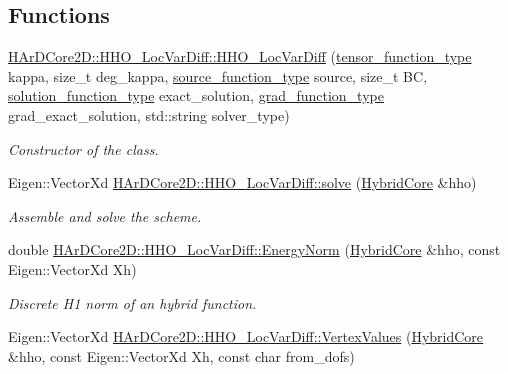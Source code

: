 \subsection*{Functions}
\begin{DoxyCompactItemize}
\item 
\hyperlink{group__HHO__LocVarDiff_ga5f2ab34d1e5afb3d83b548a1cb09f83a}{H\+Ar\+D\+Core2\+D\+::\+H\+H\+O\+\_\+\+Loc\+Var\+Diff\+::\+H\+H\+O\+\_\+\+Loc\+Var\+Diff} (\hyperlink{classHArDCore2D_1_1HHO__LocVarDiff_a15bd0c2320b456efcc07c11842c13492}{tensor\+\_\+function\+\_\+type} kappa, size\+\_\+t deg\+\_\+kappa, \hyperlink{classHArDCore2D_1_1HHO__LocVarDiff_a0bd07aa3ccc1aa9dd3c9573a5ab1c7dd}{source\+\_\+function\+\_\+type} source, size\+\_\+t BC, \hyperlink{classHArDCore2D_1_1HHO__LocVarDiff_a8bb87b6170b8a77e14d343bf76cac3d6}{solution\+\_\+function\+\_\+type} exact\+\_\+solution, \hyperlink{classHArDCore2D_1_1HHO__LocVarDiff_a00b073818ecee542bb74860b1c204d49}{grad\+\_\+function\+\_\+type} grad\+\_\+exact\+\_\+solution, std\+::string solver\+\_\+type)
\begin{DoxyCompactList}\small\item\em Constructor of the class. \end{DoxyCompactList}\item 
\mbox{\label{group__HHO__LocVarDiff_ga74eac0904256440c429fb9502112a867}} 
Eigen\+::\+Vector\+Xd \hyperlink{group__HHO__LocVarDiff_ga74eac0904256440c429fb9502112a867}{H\+Ar\+D\+Core2\+D\+::\+H\+H\+O\+\_\+\+Loc\+Var\+Diff\+::solve} (\hyperlink{classHArDCore2D_1_1HybridCore}{Hybrid\+Core} \&hho)
\begin{DoxyCompactList}\small\item\em Assemble and solve the scheme. \end{DoxyCompactList}\item 
\mbox{\label{group__HHO__LocVarDiff_gaf359d2047dc5b2fb8640a01c025fb860}} 
double \hyperlink{group__HHO__LocVarDiff_gaf359d2047dc5b2fb8640a01c025fb860}{H\+Ar\+D\+Core2\+D\+::\+H\+H\+O\+\_\+\+Loc\+Var\+Diff\+::\+Energy\+Norm} (\hyperlink{classHArDCore2D_1_1HybridCore}{Hybrid\+Core} \&hho, const Eigen\+::\+Vector\+Xd Xh)
\begin{DoxyCompactList}\small\item\em Discrete H1 norm of an hybrid function. \end{DoxyCompactList}\item 
Eigen\+::\+Vector\+Xd \hyperlink{group__HHO__LocVarDiff_gade5fe2edbaf0120b9b5794e96c30e568}{H\+Ar\+D\+Core2\+D\+::\+H\+H\+O\+\_\+\+Loc\+Var\+Diff\+::\+Vertex\+Values} (\hyperlink{classHArDCore2D_1_1HybridCore}{Hybrid\+Core} \&hho, const Eigen\+::\+Vector\+Xd Xh, const char from\+\_\+dofs)

\end{DoxyCompactItemize}
